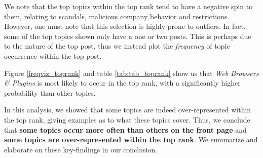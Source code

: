 \documentclass[11pt,journal,final,a4paper]{IEEEtran}
\begin{document}
We note that the top topics within the top rank tend to have a negative spin to them, relating to scandals, malicious company behavior and restrictions. However, one must note that this selection is highly prone to outliers. In fact, some of the top topics shown only have a one or two posts. This is perhaps due to the nature of the top post, thus we instead plot the \textit{frequency} of topic occurrence within the top post.

Figure \ref{freqviz_toprank} and table \ref{tab:tab_toprank} show us that \textit{Web Browsers \& Plugins} is most likely to occur in the top rank, with a significantly higher probability than other topics. 

In this analysis, we showed that some topics are indeed over-represented within the top rank, giving examples as to what these topics cover. Thus, we conclude that \textbf{some topics occur more often than others on the front page} and \textbf{some topics are over-represented within the top rank}. We summarize and elaborate on these key-findings in our conclusion. 
\end{document}
